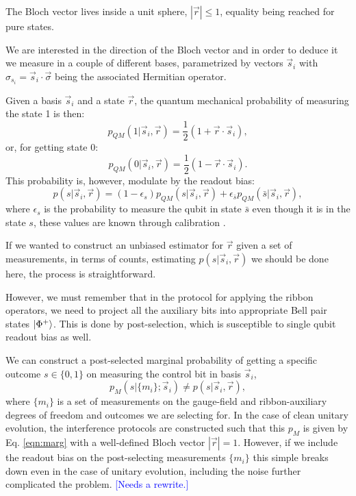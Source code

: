 \documentclass[two column]{article}
\newcommand{\jovan}[1]{\textcolor{blue}{[#1]}}
\begin{document}
The Bloch vector lives inside a unit sphere, $|\vec{r}|\leq 1$, equality being reached for pure states.

We are interested in the direction of the Bloch vector and in order to deduce it we measure in a couple of different bases, parametrized by vectors $\vec{s}_i$ with $\sigma_{s_i} = \vec{s}_i \cdot \vec{\sigma}$ being the associated Hermitian operator.

Given a basis $\vec{s}_i$ and a state $\vec{r}$, the quantum mechanical probability of measuring the state 1 is then: $$p_{QM}(1|\vec{s}_i, \vec{r}) = \frac{1}{2}(1+\vec{r}\cdot\vec{s}_i),$$ or, for getting state 0:
$$p_{QM}(0|\vec{s}_i, \vec{r}) = \frac{1}{2}(1-\vec{r}\cdot\vec{s}_i).$$
This probability is, however, modulate by the readout bias:
\begin{equation}
    p(s|\vec{s}_i, \vec{r}) = (1-\epsilon_s)p_{QM}(s|\vec{s}_i, \vec{r}) + \epsilon_{\bar{s}} p_{QM}(\bar{s}|\vec{s}_i, \vec{r}), \label{eqn:marg}
\end{equation}
where $\epsilon_s$ is the probability to measure the qubit in state $\bar{s}$ even though it is in the state $s$, these values are known through calibration \cite{}.

If we wanted to construct an unbiased estimator for $\vec{r}$ given a set of measurements, in terms of counts, estimating $p(s|\vec{s}_i, \vec{r})$ we should be done here, the process is straightforward.

However, we must remember that in the protocol for applying the ribbon operators, we need to project all the auxiliary bits into appropriate Bell pair states $\ket{\Phi^+}$.
This is done by post-selection, which is susceptible to single qubit readout bias as well.

We can construct a post-selected marginal probability of getting a specific outcome $s \in \{0, 1\}$ on measuring the control bit in basis $\vec{s}_i$, $$p_M(s |\{m_i\}; \vec{s}_i) \neq p(s|\vec{s}_i, \vec{r}) ,$$ where $\{m_i\}$ is a set of measurements on the gauge-field and ribbon-auxiliary degrees of freedom and outcomes we are selecting for.
In the case of clean unitary evolution, the interference protocols are constructed such that this $p_M$ is given by Eq. \ref{eqn:marg} with a well-defined Bloch vector $|\vec{r}| = 1$.
However, if we include the readout bias on the post-selecting measurements $\{m_i\}$ this simple breaks down even in the case of unitary evolution, including the noise further complicated the problem. \jovan{Needs a rewrite.}
\end{document}
